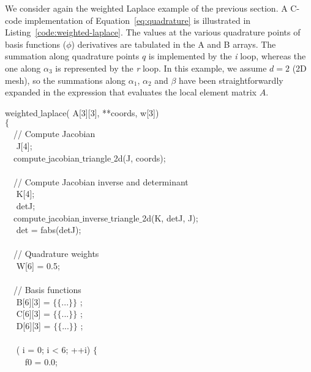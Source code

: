 We consider again the weighted Laplace example of the previous section. A C-code implementation of Equation~\ref{eq:quadrature} is illustrated in Listing~\ref{code:weighted-laplace}. The values at the various quadrature points of basis functions ($\phi$) derivatives are tabulated in the A and B arrays. The summation along quadrature points $q$ is implemented by the \emph{i} loop, whereas the one along $\alpha_3$ is represented by the \emph{r} loop. In this example, we assume $d=2$ (2D mesh), so the summations along $\alpha_1$, $\alpha_2$ and $\beta$ have been straightforwardly expanded in the expression that evaluates the local element matrix $A$. 

\begin{algorithm}[t]
\scriptsize\ttfamily
{}

 weighted$\_$laplace( A[3][3],  **coords,  w[3]) \\
$\lbrace$ \\
~~// Compute Jacobian \\
~~ J[4]; \\
~~compute$\_$jacobian$\_$triangle$\_$2d(J, coords); \\
~~\\
~~// Compute Jacobian inverse and determinant \\
~~ K[4]; \\
~~ detJ; \\
~~compute$\_$jacobian$\_$inverse$\_$triangle$\_$2d(K, detJ, J); \\
~~ det = fabs(detJ); \\
~~\\
~~// Quadrature weights \\
~~ W[6] = {0.5}; \\
~~\\
~~// Basis functions \\
~~ B[6][3] = $\lbrace\lbrace$...$\rbrace\rbrace$ ;\\
~~ C[6][3] = $\lbrace\lbrace$...$\rbrace\rbrace$ ;\\
~~ D[6][3] = $\lbrace\lbrace$...$\rbrace\rbrace$ ;\\
~~\\
~~ ( i = 0; i < 6; ++i) $\lbrace$ \\
~~~~ f0  = 0.0;\\

\end{algorithm}
